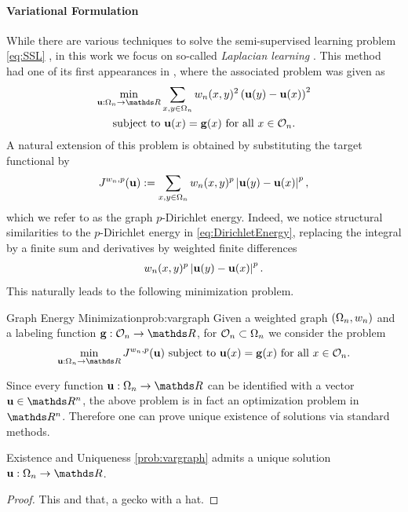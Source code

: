 \paragraph{Variational Formulation}
While there are various techniques to solve the semi-supervised learning problem \eqref{eq:SSL} \cite{}, 
in this work we 
focus on so-called \emph{Laplacian learning} \cite{belkin2006laplacian}. %
This method had one of its first appearances in 
\cite{zhu2003semi}, where the associated problem was given as
%
\begin{gather}\label{eq:SSL_Laplacian}
\begin{gathered}
\min_{\vec u:\domain_n\to\R} \sum_{x,y\in\domain_n} w_n(x,y)^2 
\left(\vec u(y) - \vec u(x) \right)^2\\
\text{subject to } \vec u(x) = \vec g(x) \text{ for all } x\in\conset_n.
\end{gathered}
\end{gather}
%
A natural extension of this problem is obtained by substituting the target functional by
%
\begin{align*}
J^{w_n,p}(\mathbf{u}):= \sum_{x,y\in\Omega_n} w_n(x,y)^p \left|\mathbf{u}(y) - \mathbf{u}(x)\right|^p,
\end{align*}
%
which we refer to as the graph $p$-Dirichlet energy. Indeed, we notice structural 
similarities to the $p$-Dirichlet energy in \cref{eq:DirichletEnergy}, replacing the integral by a finite 
sum and derivatives by weighted finite differences
%
\begin{align*}
 w_n(x,y)^p \left|\mathbf{u}(y) - \mathbf{u}(x)\right|^p.
\end{align*}
%
This naturally leads to the following minimization problem.
%
\begin{problem}{Graph Energy Minimization}{prob:vargraph}
Given a weighted graph $(\Omega_n, w_n)$ and a labeling function $\vec g:\conset_n\to\R$, for $\mathcal{O}_n\subset\Omega_n$ we consider 
the problem
%
\begin{align*}
\min_{\vec u:\domain_n\to\R} J^{w_n,p}(\vec u) \text{ subject to } \vec u(x) = \vec g(x) \text{ for all } x\in\conset_n.
\end{align*}
\end{problem}
%
Since every function $\vec u:\domain_n\to\R$ can be identified with a vector $\vec u\in\R^n$, the above problem 
is in fact an optimization problem in $\R^n$. Therefore one can prove unique existence of solutions via standard methods.
%
\begin{theorem}{Existence and Uniqueness}{}
\cref{prob:vargraph} admits a unique solution $\vec u:\domain_n\to\R$.
\end{theorem}
%
\begin{proof}
This and that, a gecko with a hat.
\end{proof}
%

